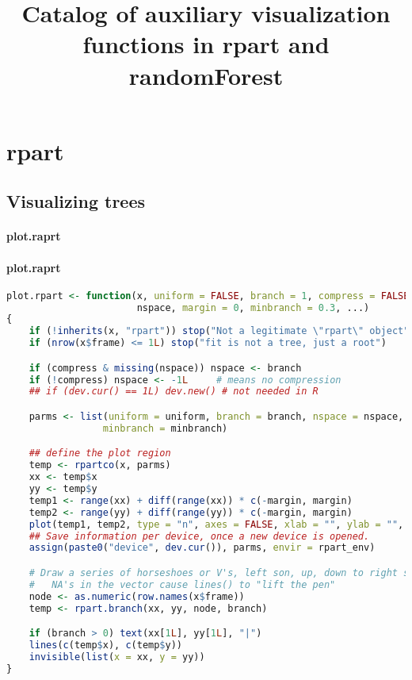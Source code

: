 \documentclass[10pt,a4paper]{article}
\title{Catalog of auxiliary visualization functions in rpart and randomForest}
\begin{document}
\maketitle
{}
\newpage
\tableofcontents
\newpage
{}
\section{rpart}
\subsection{Visualizing trees}
\bigskip
\paragraph*{plot.raprt}
\paragraph{plot.raprt}
\begin{lstlisting}[language=R]
plot.rpart <- function(x, uniform = FALSE, branch = 1, compress = FALSE,
                       nspace, margin = 0, minbranch = 0.3, ...)
{
    if (!inherits(x, "rpart")) stop("Not a legitimate \"rpart\" object")
    if (nrow(x$frame) <= 1L) stop("fit is not a tree, just a root")

    if (compress & missing(nspace)) nspace <- branch
    if (!compress) nspace <- -1L     # means no compression
    ## if (dev.cur() == 1L) dev.new() # not needed in R

    parms <- list(uniform = uniform, branch = branch, nspace = nspace,
                 minbranch = minbranch)

    ## define the plot region
    temp <- rpartco(x, parms)
    xx <- temp$x
    yy <- temp$y
    temp1 <- range(xx) + diff(range(xx)) * c(-margin, margin)
    temp2 <- range(yy) + diff(range(yy)) * c(-margin, margin)
    plot(temp1, temp2, type = "n", axes = FALSE, xlab = "", ylab = "", ...)
    ## Save information per device, once a new device is opened.
    assign(paste0("device", dev.cur()), parms, envir = rpart_env)

    # Draw a series of horseshoes or V's, left son, up, down to right son
    #   NA's in the vector cause lines() to "lift the pen"
    node <- as.numeric(row.names(x$frame))
    temp <- rpart.branch(xx, yy, node, branch)

    if (branch > 0) text(xx[1L], yy[1L], "|")
    lines(c(temp$x), c(temp$y))
    invisible(list(x = xx, y = yy))
}
\end{lstlisting}
\end{document}
